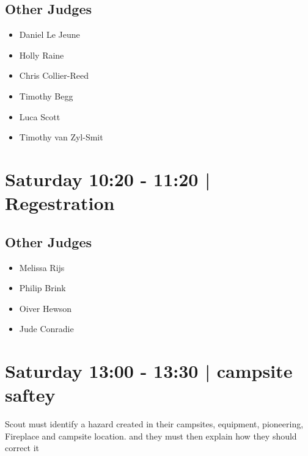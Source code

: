 \documentclass[10pt]{article}
\begin{document}
                
        \subsection*{Other Judges}
        
            \begin{itemize}
                            \item Daniel Le Jeune
                            \item Holly Raine
                            \item Chris Collier-Reed
                            \item Timothy Begg
                            \item Luca Scott
                            \item Timothy van Zyl-Smit
                        \end{itemize}
        

            \section*{Saturday 10:20
        -
        11:20
        |
         Regestration}
        
                
        \subsection*{Other Judges}
        
            \begin{itemize}
                            \item Melissa Rijs
                            \item Philip Brink
                            \item Oiver Hewson
                            \item Jude Conradie
                        \end{itemize}
        

            \section*{Saturday 13:00
        -
        13:30
        |
         campsite saftey}
        
                            Scout must identify a hazard created in their campsites, equipment, pioneering, Fireplace and campsite location. and they must then explain how they should correct it
        
\end{document}
